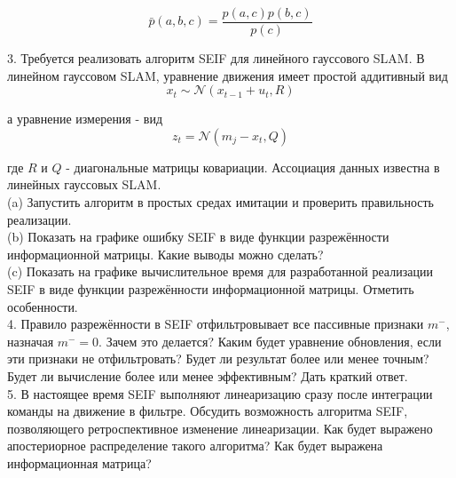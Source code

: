 \documentclass[10pt,a4paper]{article}
\begin{document}
$$\bar{p}(a,b,c)=\frac{p(a,c)p(b,c)}{p(c)}$$

3.	Требуется реализовать алгоритм SEIF для линейного гауссового SLAM. В линейном гауссовом SLAM, уравнение движения имеет простой аддитивный вид\\

$$x_t\sim\mathcal{N}(x_{t-1}+u_t,R)$$

а уравнение измерения - вид\\

$$z_t=\mathcal{N}(m_j-x_t,Q)$$

где $R$ и $Q$ - диагональные матрицы ковариации. Ассоциация данных известна в линейных гауссовых SLAM.\\

(a)	Запустить алгоритм в простых средах имитации и проверить правильность реализации.\\

(b)	Показать на графике ошибку SEIF в виде функции разрежённости информационной матрицы. Какие выводы можно сделать?\\

(c)	Показать на графике вычислительное время для разработанной реализации SEIF в виде функции разрежённости информационной матрицы. Отметить особенности.\\

4.	Правило разрежённости в SEIF отфильтровывает все пассивные признаки $m^-$, назначая $m^-=0$. Зачем это делается? Каким будет уравнение обновления, если эти признаки не отфильтровать? Будет ли результат более или менее точным? Будет ли вычисление более или менее эффективным? Дать краткий ответ.\\

5.	В настоящее время SEIF выполняют линеаризацию сразу после интеграции команды на движение в фильтре. Обсудить возможность алгоритма SEIF, позволяющего ретроспективное изменение линеаризации. Как будет выражено апостериорное распределение такого алгоритма? Как будет выражена информационная матрица?\\










 
\end{document}
